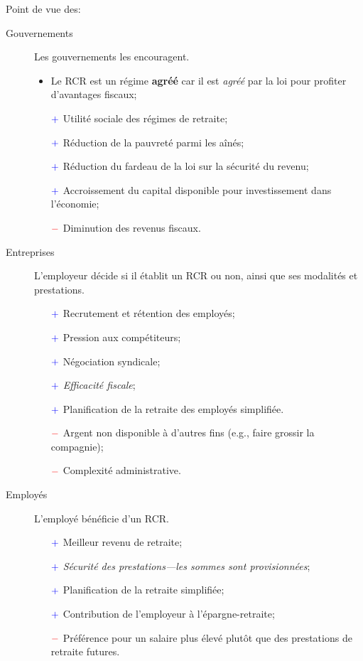 \documentclass[10pt, french]{article}
\begin{document}
\begin{multicols*}{3}
Point de vue des:
\begin{description}
	\item[Gouvernements]	Les gouvernements les encouragent.
		\begin{itemize}[leftmargin = *]
		\item	Le RCR est un régime \textbf{agréé} car il est \textit{agréé} par la loi pour profiter d'avantages fiscaux;
		\item[$\color{blue}+$]	Utilité sociale des régimes de retraite;
		\item[$\color{blue}+$]	Réduction de la pauvreté parmi les aînés;
		\item[$\color{blue}+$]	Réduction du fardeau de la loi sur la sécurité du revenu;
		\item[$\color{blue}+$]	Accroissement du capital disponible pour investissement dans l'économie;
		\item[$\color{red}-$]	Diminution des revenus fiscaux.
		\end{itemize}
	\item[Entreprises]	L'employeur décide si il établit un RCR ou non, ainsi que ses modalités et prestations.
		\begin{itemize}[leftmargin = *]
		\item[$\color{blue}+$]	Recrutement et rétention des employés;
		\item[$\color{blue}+$]	Pression aux compétiteurs;
		\item[$\color{blue}+$]	Négociation syndicale;
		\item[$\color{blue}+$]	\textit{Efficacité fiscale};
		\item[$\color{blue}+$]	Planification de la retraite des employés simplifiée.
		\item[$\color{red}-$]	Argent non disponible à d'autres fins (e.g., faire grossir la compagnie);
		\item[$\color{red}-$]	Complexité administrative.
		\end{itemize}
	\item[Employés]	L'employé bénéficie d'un RCR.
		\begin{itemize}[leftmargin = *]
		\item[$\color{blue}+$]	Meilleur revenu de retraite;
		\item[$\color{blue}+$]	\textit{Sécurité des prestations---les sommes sont provisionnées};
		\item[$\color{blue}+$]	Planification de la retraite simplifiée;
		\item[$\color{blue}+$]	Contribution de l'employeur à l'épargne-retraite;
		\item[$\color{red}-$]	Préférence pour un salaire plus élevé plutôt que des prestations de retraite futures.
		\end{itemize}
\end{description}


\end{multicols*}
\end{document}
